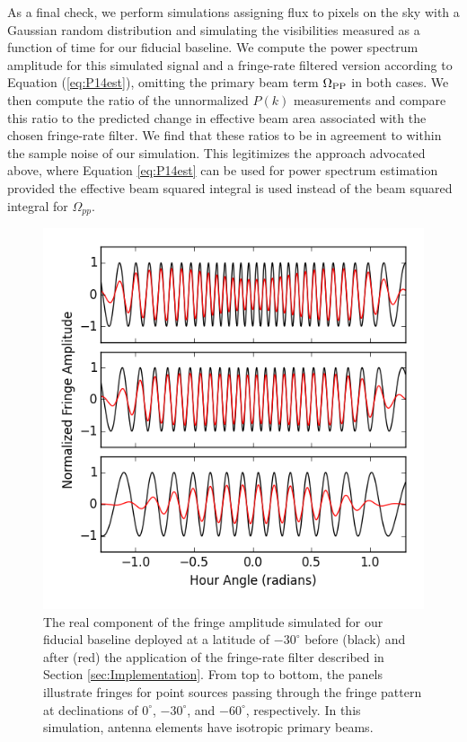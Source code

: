 \documentclass[twocolumn,apj,numberedappendix]{emulateapj}
\begin{document}
As a final check, we perform simulations assigning flux to pixels on the sky with a Gaussian random distribution
and simulating the visibilities measured as a function of time for our fiducial baseline.  We compute the
power spectrum amplitude for this simulated signal and a fringe-rate filtered version according to
Equation (\ref{eq:P14est}), omitting the primary beam term $\Omega_{\rm PP}$ in both cases.  We then compute
the ratio of the unnormalized $P(k)$ measurements and compare this ratio to the predicted change in effective
beam area associated with the chosen fringe-rate filter.  We find that these ratios to be in agreement 
to within the sample noise of our simulation. This legitimizes the approach advocated above, where
Equation \eqref{eq:P14est} can be used for power spectrum estimation provided the effective beam
squared integral is used instead of the beam squared integral for $\Omega_{pp}$.


\begin{figure}\centering
\includegraphics[width=0.9\columnwidth]{plots/src_track_flat.png}
\caption{
The real component of the fringe amplitude simulated for our fiducial 
baseline deployed at a latitude of $-30^\circ$
before (black) and after (red) the application
of the fringe-rate filter described in Section \ref{sec:Implementation}.  From top to bottom,
the panels illustrate fringes
for point sources 
passing through the fringe pattern at declinations of $0^\circ$,
$-30^\circ$, and $-60^\circ$, respectively.  In this simulation,
antenna elements have isotropic primary beams.
}\label{fig:src_track_flat}
\end{figure}
\end{document}
